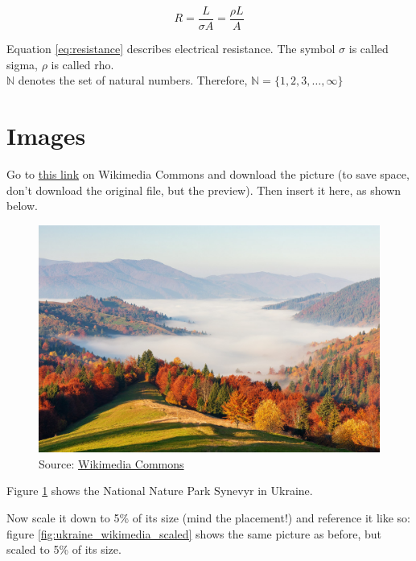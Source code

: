 \documentclass[a4paper]{article}
\begin{document}
\begin{equation} \label{eq:resistance}
    R = \frac{L}{{\sigma A}} = \frac{{\rho L}}{A}
\end{equation}	

\noindent Equation \ref{eq:resistance} describes electrical resistance. The symbol $\sigma$ is called sigma, $\rho$ is called rho.\\

\noindent $\mathbb{N}$ denotes the set of natural numbers. Therefore, $ \mathbb{N}=\{1,2,3,\ldots,\infty\} $

\newpage

\section*{Images}

Go to \href{https://commons.wikimedia.org/wiki/Category:Featured_pictures_of_Ukraine#/media/File:21-224-5054_NNP_Synevyr_RB_18.jpg}{this link} on Wikimedia Commons and download the picture (to save space, don't download the original file, but the preview). Then insert it here, as shown below.
\begin{figure}[h!]
    \centering
    \includegraphics[width=\textwidth]{ukraine_wikimedia.jpg}
    \caption{Source: \href{https://commons.wikimedia.org/wiki/File:21-224-5054_NNP_Synevyr_RB_18.jpg}{Wikimedia Commons}}
    \label{fig:ukraine_wikimedia}
\end{figure}

Figure \ref{fig:ukraine_wikimedia} shows the National Nature Park Synevyr in Ukraine.

\newpage

Now scale it down to 5\% of its size (mind the placement!) and reference it like so: figure \ref{fig:ukraine_wikimedia_scaled} shows the same picture as before, but scaled to 5\% of its size.
\end{document}
